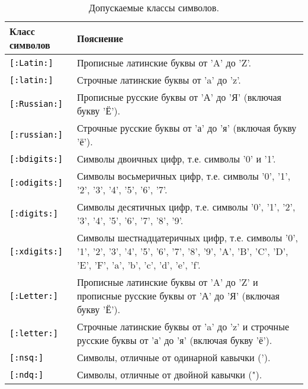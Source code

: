 \documentclass[10pt]{report}
\begin{document}
\begin{table}[!h]
\centering
\caption{Допускаемые классы символов.}
\vspace{1mm}
\begin{tabular}{|l|p{125mm}|}\hline 
Класс символов                          & Пояснение                                                                               \\ \hline
\texttt{\textcolor{Black}{[:Latin:]}}   & Прописные латинские буквы от 'A' до 'Z'.                                                \\ \hline 
\texttt{\textcolor{Black}{[:latin:]}}   & Строчные латинские буквы от 'a' до 'z'.                                                 \\ \hline 
\texttt{\textcolor{Black}{[:Russian:]}} & Прописные русские буквы от 'А' до 'Я' (включая букву 'Ё').                              \\ \hline
\texttt{\textcolor{Black}{[:russian:]}} & Строчные русские буквы от 'а' до 'я' (включая букву 'ё').                               \\ \hline
\texttt{\textcolor{Black}{[:bdigits:]}} & Символы двоичных цифр, т.е. символы '0' и '1'.                                          \\ \hline
\texttt{\textcolor{Black}{[:odigits:]}} & Символы восьмеричных цифр, т.е. символы '0', '1', '2', '3', '4', '5', '6', '7'.         \\ \hline
\texttt{\textcolor{Black}{[:digits:]}}  & Символы десятичных цифр, т.е. символы '0', '1', '2', '3', '4', '5', '6', '7', '8', '9'. \\ \hline
\texttt{\textcolor{Black}{[:xdigits:]}} & Символы шестнадцатеричных цифр, т.е. символы '0', '1', '2', '3', '4', '5', '6', '7', '8', '9', 'A', 'B', 'C', 'D', 'E', 'F', 'a', 'b', 'c', 'd', 'e', 'f'.\\ \hline
\texttt{\textcolor{Black}{[:Letter:]}}  & Прописные латинские буквы от 'A' до 'Z' и прописные русские буквы от 'А' до 'Я' (включая букву 'Ё').  \\ \hline
\texttt{\textcolor{Black}{[:letter:]}}  & Строчные латинские буквы от 'a' до 'z' и строчные русские буквы от 'а' до 'я' (включая букву 'ё').    \\ \hline
\texttt{\textcolor{Black}{[:nsq:]}}     & Символы, отличные от одинарной кавычки (').\\ \hline
\texttt{\textcolor{Black}{[:ndq:]}}     & Символы, отличные от двойной кавычки (").\\ \hline
\end{tabular} 
\end{table}
\end{document}
